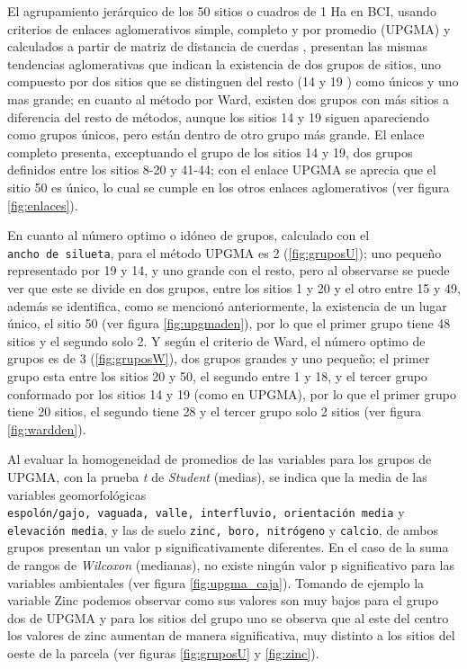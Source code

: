 \documentclass[11pt,]{article}
\begin{document}
El agrupamiento jerárquico de los 50 sitios o cuadros de 1 Ha en BCI,
usando criterios de enlaces aglomerativos simple, completo y por
promedio (UPGMA) y calculados a partir de matriz de distancia de cuerdas
, presentan las mismas tendencias aglomerativas que indican la
existencia de dos grupos de sitios, uno compuesto por dos sitios que se
distinguen del resto (14 y 19 ) como únicos y uno mas grande; en cuanto
al método por Ward, existen dos grupos con más sitios a diferencia del
resto de métodos, aunque los sitios 14 y 19 siguen apareciendo como
grupos únicos, pero están dentro de otro grupo más grande. El enlace
completo presenta, exceptuando el grupo de los sitios 14 y 19, dos
grupos definidos entre los sitios 8-20 y 41-44; con el enlace UPGMA se
aprecia que el sitio 50 es único, lo cual se cumple en los otros enlaces
aglomerativos (ver figura \ref{fig:enlaces}).

En cuanto al número optimo o idóneo de grupos, calculado con el
\texttt{ancho\ de\ silueta}, para el método UPGMA es 2
(\ref{fig:gruposU}); uno pequeño representado por 19 y 14, y uno grande
con el resto, pero al observarse se puede ver que este se divide en dos
grupos, entre los sitios 1 y 20 y el otro entre 15 y 49, además se
identifica, como se mencionó anteriormente, la existencia de un lugar
único, el sitio 50 (ver figura \ref{fig:upgmaden}), por lo que el primer
grupo tiene 48 sitios y el segundo solo 2. Y según el criterio de Ward,
el número optimo de grupos es de 3 (\ref{fig:gruposW}), dos grupos
grandes y uno pequeño; el primer grupo esta entre los sitios 20 y 50, el
segundo entre 1 y 18, y el tercer grupo conformado por los sitios 14 y
19 (como en UPGMA), por lo que el primer grupo tiene 20 sitios, el
segundo tiene 28 y el tercer grupo solo 2 sitios (ver figura
\ref{fig:wardden}).

Al evaluar la homogeneidad de promedios de las variables para los grupos
de UPGMA, con la prueba \emph{t} de \emph{Student} (medias), se indica
que la media de las variables geomorfológicas
\texttt{espolón/gajo,\ vaguada,\ valle,\ interfluvio,\ orientación\ media}
y \texttt{elevación\ media}, y las de suelo
\texttt{zinc,\ boro,\ nitrógeno} y \texttt{calcio}, de ambos grupos
presentan un valor p significativamente diferentes. En el caso de la
suma de rangos de \emph{Wilcoxon} (medianas), no existe ningún valor p
significativo para las variables ambientales (ver figura
\ref{fig:upgma_caja}). Tomando de ejemplo la variable Zinc podemos
observar como sus valores son muy bajos para el grupo dos de UPGMA y
para los sitios del grupo uno se observa que al este del centro los
valores de zinc aumentan de manera significativa, muy distinto a los
sitios del oeste de la parcela (ver figuras \ref{fig:gruposU} y
\ref{fig:zinc}).
\end{document}
